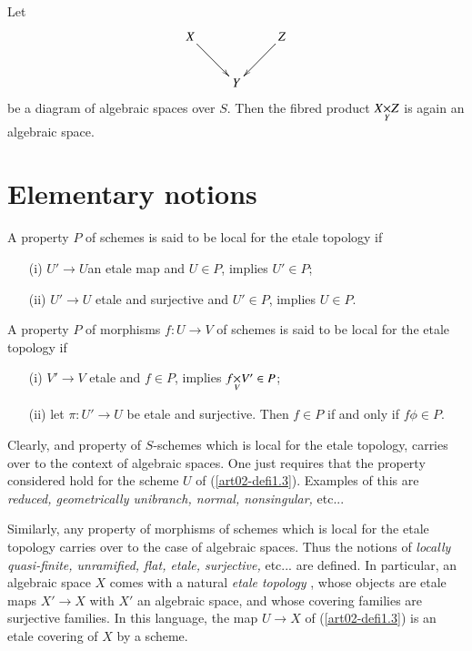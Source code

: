 \begin{proposition}\label{art02-prop1.8}
Let
\[
\xymatrix{
X\ar[dr] & & Z\ar[dl]\\
 & Y &
}
\]
be a diagram of algebraic spaces over $S$. Then the fibred product $\fprod{X}{Z}{Y}$ is again an algebraic space.
\end{proposition}

\section{Elementary notions}\label{art02-sec2}

\begin{definition}\label{art02-defi2.1}
A property $P$ of schemes is said to be local for the etale topology if
\begin{itemize}
\item[\rm(i)] $U'\to U$\pageoriginale an etale map and $U\in P$, implies $U'\in P$;

\item[\rm(ii)] $U'\to U$ etale and surjective and $U'\in P$, implies $U\in P$.
\end{itemize}
A property $P$ of morphisms $f:U\to V$ of schemes is said to be local for the etale topology if
\begin{itemize}
\item[\rm(i)] $V'\to V$ etale and $f\in P$, implies $\fprod{f}{V'}{V}\in P$;

\item[\rm(ii)] let $\pi:U'\to U$ be etale and surjective. Then $f\in P$ if and only if $f\phi\in P$.
\end{itemize}
\end{definition}

Clearly, and property of $S$-schemes which is local for the etale topology, carries over to the context of algebraic spaces. One just requires that the property considered hold for the scheme $U$ of (\ref{art02-defi1.3}). Examples of this are {\em reduced, geometrically unibranch, normal, nonsingular,} etc...

Similarly, any property of morphisms of schemes which is local for the etale topology carries over to the case of algebraic spaces. Thus the notions of {\em locally quasi-finite, unramified, flat, etale, surjective,} etc... are defined. In particular, an algebraic space $X$ comes with a natural {\em etale topology} \cite{art02-key1}, whose objects are etale maps $X'\to X$ with $X'$ an algebraic space, and whose covering families are surjective families. In this language, the map $U\to X$ of (\ref{art02-defi1.3}) is an etale covering of $X$ by a scheme.

